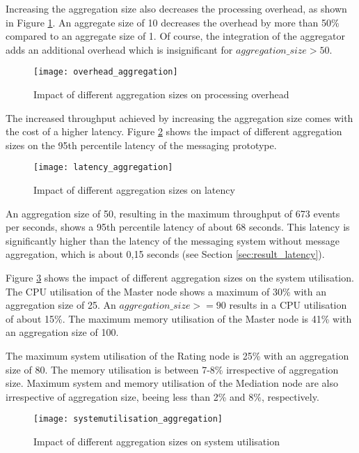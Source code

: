 Increasing the aggregation size also decreases the processing overhead, as shown in Figure \ref{fig:overhead_aggregation}. An aggregate size of 10 decreases the overhead by more than 50\% compared to an aggregate size of 1. Of course, the integration of the aggregator adds an additional overhead which is insignificant for $aggregation\_size>50$.
\begin{figure}[htbp]
	\centering
	\texttt{[image: overhead\_aggregation]}
	\caption{Impact of different aggregation sizes on processing overhead}
	\label{fig:overhead_aggregation}
\end{figure}

The increased throughput achieved by increasing the aggregation size comes with the cost of a higher latency. Figure \ref{fig:latency_aggregation} shows the impact of different aggregation sizes on the 95th percentile latency of the messaging prototype. 
\begin{figure}[htbp]
	\centering
	\texttt{[image: latency\_aggregation]}
	\caption{Impact of different aggregation sizes on latency}
	\label{fig:latency_aggregation}
\end{figure}

An aggregation size of 50, resulting in the maximum throughput of 673 events per seconds, shows a 95th percentile latency of about 68 seconds. This latency is significantly higher than the latency of the messaging system without message aggregation, which is about 0,15 seconds (see Section \ref{sec:result_latency}).

Figure \ref{fig:systemutilisation_aggregation} shows the impact of different aggregation sizes on the system utilisation. The CPU utilisation of the Master node shows a maximum of 30\% with an aggregation size of 25. An $aggregation\_size >= 90$ results in a CPU utilisation of about 15\%. The maximum memory utilisation of the Master node is 41\% with an aggregation size of 100.

The maximum system utilisation of the Rating node is 25\% with an aggregation size of 80. The memory utilisation is between 7-8\% irrespective of aggregation size. Maximum system and memory utilisation of the Mediation node are also irrespective of aggregation size, beeing less than 2\% and 8\%, respectively.

\begin{figure}[htbp]
	\centering
	\texttt{[image: systemutilisation\_aggregation]}
	\caption{Impact of different aggregation sizes on system utilisation}
	\label{fig:systemutilisation_aggregation}
\end{figure}

